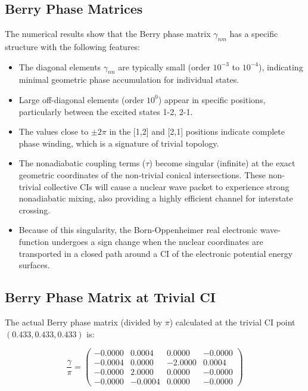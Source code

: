 \documentclass{article}
\begin{document}
\subsection{Berry Phase Matrices}

The numerical results show that the Berry phase matrix $\gamma_{nm}$ has a specific structure with the following features:

\begin{itemize}
    \item The diagonal elements $\gamma_{nn}$ are typically small (order $10^{-3}$ to $10^{-4}$), indicating minimal geometric phase accumulation for individual states.
    
    \item Large off-diagonal elements (order $10^0$) appear in specific positions, particularly between the excited states 1-2, 2-1.
    
    \item The values close to $\pm 2\pi$ in the [1,2] and [2,1] positions indicate complete phase winding, which is a signature of trivial topology.

    \item The nonadiabatic coupling terms ($\tau$) become singular (infinite) at the exact geometric coordinates of the non-trivial conical intersections. These non-trivial collective CIs will cause a nuclear wave packet to experience strong nonadiabatic mixing, also providing a highly efficient channel for interstate crossing.
    
    \item Because of this singularity, the Born-Oppenheimer real electronic wave-function undergoes a sign change when the nuclear coordinates are transported in a closed path around a CI of the electronic potential energy surfaces.
\end{itemize}

\subsection{Berry Phase Matrix at Trivial CI}

The actual Berry phase matrix (divided by $\pi$) calculated at the trivial CI point $(0.433, 0.433, 0.433)$ is:

\begin{equation}
\frac{\gamma}{\pi} = 
\begin{pmatrix}
-0.0000 & 0.0004 & 0.0000 & -0.0000 \\
-0.0004 & 0.0000 & -2.0000 & 0.0004 \\
-0.0000 & 2.0000 & 0.0000 & -0.0000 \\
-0.0000 & -0.0004 & 0.0000 & -0.0000
\end{pmatrix}
\end{equation}
\end{document}
